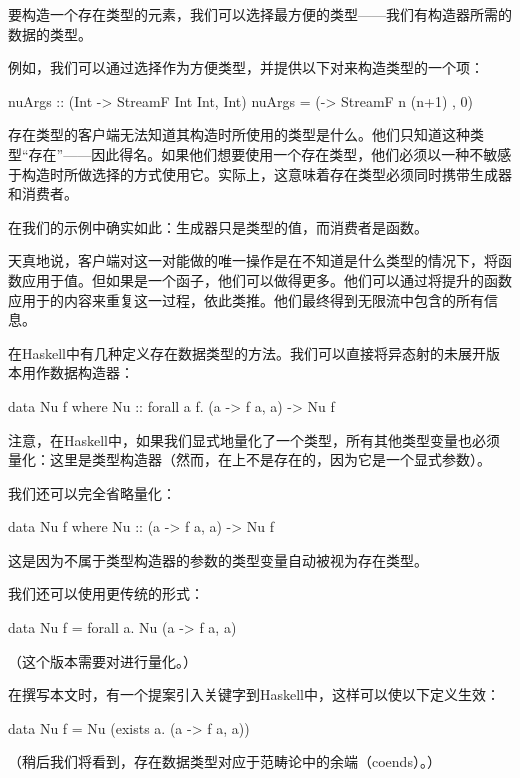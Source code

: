 \documentclass[DaoFP]{subfiles}
\begin{document}
    要构造一个存在类型的元素，我们可以选择最方便的类型——我们有构造器所需的数据的类型。

    例如，我们可以通过选择作为方便类型，并提供以下对来构造类型的一个项：
    \begin{haskell}
        nuArgs :: (Int -> StreamF Int Int, Int)
        nuArgs =  (\n -> StreamF n (n+1) , 0)
    \end{haskell}

    存在类型的客户端无法知道其构造时所使用的类型是什么。他们只知道这种类型“存在”——因此得名。如果他们想要使用一个存在类型，他们必须以一种不敏感于构造时所做选择的方式使用它。实际上，这意味着存在类型必须同时携带生成器和消费者。

    在我们的示例中确实如此：生成器只是类型的值，而消费者是函数。

    天真地说，客户端对这一对能做的唯一操作是在不知道是什么类型的情况下，将函数应用于值。但如果是一个函子，他们可以做得更多。他们可以通过将提升的函数应用于的内容来重复这一过程，依此类推。他们最终得到无限流中包含的所有信息。

    在Haskell中有几种定义存在数据类型的方法。我们可以直接将异态射的未展开版本用作数据构造器：
    \begin{haskell}
        data Nu f where
        Nu :: forall a f. (a -> f a, a) -> Nu f
    \end{haskell}
    注意，在Haskell中，如果我们显式地量化了一个类型，所有其他类型变量也必须量化：这里是类型构造器（然而，在上不是存在的，因为它是一个显式参数）。

    我们还可以完全省略量化：
    \begin{haskell}
        data Nu f where
        Nu :: (a -> f a, a) -> Nu f
    \end{haskell}
    这是因为不属于类型构造器的参数的类型变量自动被视为存在类型。

    我们还可以使用更传统的形式：
    \begin{haskell}
        data Nu f = forall a. Nu (a -> f a, a)
    \end{haskell}
    （这个版本需要对进行量化。）

    在撰写本文时，有一个提案引入关键字到Haskell中，这样可以使以下定义生效：
    \begin{haskell}
        data Nu f = Nu (exists a. (a -> f a, a))
    \end{haskell}
    （稍后我们将看到，存在数据类型对应于范畴论中的余端（coends）。）
\end{document}
